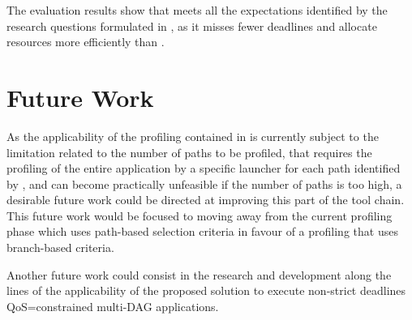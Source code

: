 The evaluation results show that \tool meets all the expectations identified by the research questions formulated in , as it misses fewer deadlines and allocate resources more efficiently than \cSpark. 

\section{Future Work}\label{sec:future_work}
As the applicability of the profiling contained in \tool is currently subject to the limitation related to the number of paths to be profiled, that requires the profiling of the entire application by a specific launcher for each path identified by \dSymb, and can become practically unfeasible if the number of paths is too high, a desirable future work could be directed at improving this part of the tool chain. This future work would be focused to moving away from the current profiling phase which uses path-based selection criteria in favour of a profiling  that uses branch-based criteria. 
 
Another future work could consist in the research and development along the lines of the applicability of the proposed solution to execute non-strict deadlines QoS=constrained multi-DAG applications.


